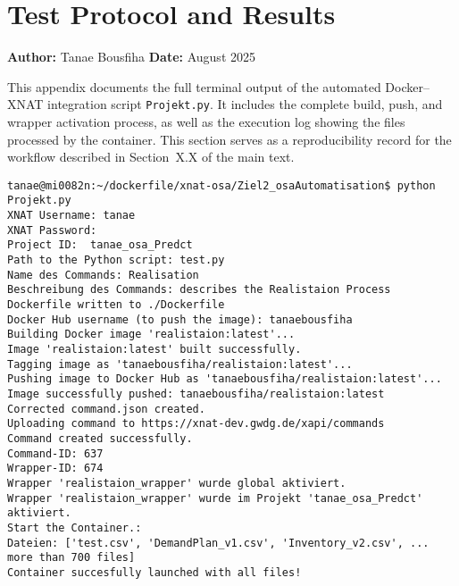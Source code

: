 
    

\appendix
\section{Test Protocol and Results}
\label{app:test}

\noindent\textbf{Author:} Tanae Bousfiha  
\noindent\textbf{Date:} August 2025  

\noindent This appendix documents the full terminal output of the automated Docker–XNAT integration script
\texttt{Projekt.py}.  
It includes the complete build, push, and wrapper activation process, as well as the execution log showing the files processed by the container.  
This section serves as a reproducibility record for the workflow described in Section~X.X of the main text.

\begin{lstlisting}
tanae@mi0082n:~/dockerfile/xnat-osa/Ziel2_osaAutomatisation$ python Projekt.py
XNAT Username: tanae
XNAT Password:
Project ID:  tanae_osa_Predct
Path to the Python script: test.py
Name des Commands: Realisation
Beschreibung des Commands: describes the Realistaion Process
Dockerfile written to ./Dockerfile
Docker Hub username (to push the image): tanaebousfiha
Building Docker image 'realistaion:latest'...
Image 'realistaion:latest' built successfully.
Tagging image as 'tanaebousfiha/realistaion:latest'...
Pushing image to Docker Hub as 'tanaebousfiha/realistaion:latest'...
Image successfully pushed: tanaebousfiha/realistaion:latest
Corrected command.json created.
Uploading command to https://xnat-dev.gwdg.de/xapi/commands
Command created successfully.
Command-ID: 637
Wrapper-ID: 674
Wrapper 'realistaion_wrapper' wurde global aktiviert.
Wrapper 'realistaion_wrapper' wurde im Projekt 'tanae_osa_Predct' aktiviert.
Start the Container.:
Dateien: ['test.csv', 'DemandPlan_v1.csv', 'Inventory_v2.csv', ... more than 700 files]
Container succesfully launched with all files!
\end{lstlisting}

